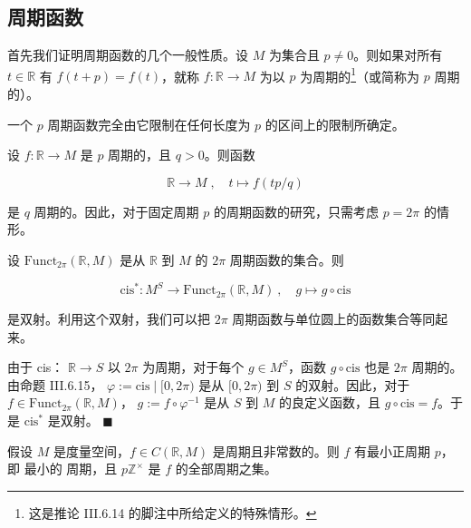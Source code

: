 \subsection*{周期函数}

首先我们证明周期函数的几个一般性质。设 $M$ 为集合且 $p \neq 0$。则如果对所有 $t \in \mathbb{R}$ 有 $f(t + p) = f(t)$，就称 $f: \mathbb{R} \to M$ 为以 $p$ 为周期的\footnote{这是推论 III.6.14 的脚注中所给定义的特殊情形。}（或简称为 $p$ 周期的）。

\begin{remark}

\begin{items}
\item

一个 $p$ 周期函数完全由它限制在任何长度为 $p$ 的区间上的限制所确定。

\item

设  $f: \mathbb{R} \to M$ 是 $p$ 周期的，且  $q > 0$。则函数

\[
\mathbb{R}\to M\;,\quad t\mapsto f(t p/q)
\]

是 $q$ 周期的。因此，对于固定周期 $p$ 的周期函数的研究，只需考虑  $p = 2\pi$ 的情形。

\item

设  $\mathrm{Funct}_{2\pi}(\mathbb{R}, M)$ 是从  $\mathbb{R}$ 到  $M$ 的  $2\pi$ 周期函数的集合。则

\[
\mathrm{c i s}^{*}\colon M^{S}\to\mathrm{F u n c t}_{2\pi}({\mathbb R},M)~,\quad g\mapsto g\circ\mathrm{c i s}
\]

是双射。利用这个双射，我们可以把  $2\pi$ 周期函数与单位圆上的函数集合等同起来。

\proofhead
由于 cis： $\mathbb{R} \to S$ 以  $2\pi$ 为周期，对于每个  $g \in M^S$，函数  $g \circ \mathrm{cis}$ 也是  $2\pi$ 周期的。由命题 III.6.15， $\varphi := \mathrm{cis} \mid [0, 2\pi)$ 是从  $[0, 2\pi)$ 到  $S$ 的双射。因此，对于  $f \in \mathrm{Funct}_{2\pi}(\mathbb{R}, M)$， $g := f \circ \varphi^{-1}$ 是从  $S$ 到  $M$ 的良定义函数，且  $g \circ \mathrm{cis} = f$。于是  $\mathrm{cis}^*$ 是双射。 $ \blacksquare $
\item

假设 $M$ 是度量空间，$f \in C(\mathbb{R}, M)$ 是周期且非常数的。则 $f$ 有最小正周期 $p$，即 $\text{最小的}$ 周期，且 $p\mathbb{Z}^\times$ 是 $f$ 的全部周期之集。


\end{items}
\end{remark}
